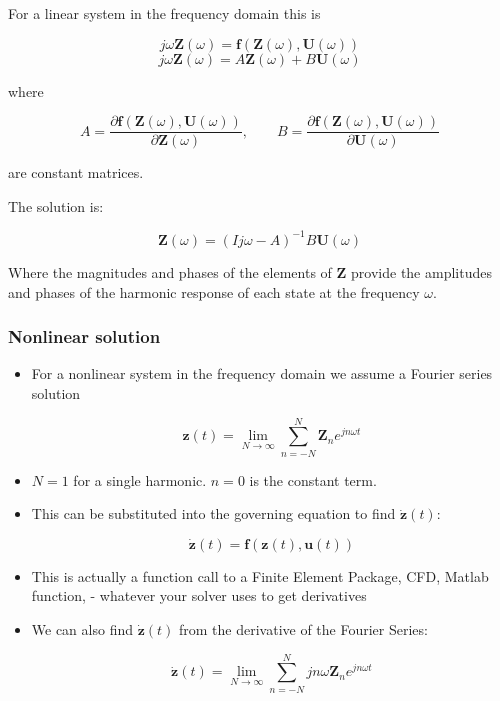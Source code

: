 \documentclass[11pt]{article}
\begin{document}
    For a linear system in the frequency domain this is

\begin{equation}
j\omega\mathbf{Z}(\omega)=\mathbf{f}(\mathbf{Z}(\omega),\mathbf{U}(\omega))
\end{equation}\begin{equation}
j\omega\mathbf{Z}(\omega)=A\mathbf{Z}(\omega)+B\mathbf{U}(\omega)
\end{equation}

where

\begin{equation}
A = \frac{\partial \mathbf{f}(\mathbf{Z}(\omega),\mathbf{U}(\omega))}{\partial\mathbf{Z}(\omega)},\qquad
B = \frac{\partial \mathbf{f}(\mathbf{Z}(\omega),\mathbf{U}(\omega))}{\partial\mathbf{U}(\omega)}
\end{equation}

are constant matrices.

The solution is:

\begin{equation}
\mathbf{Z}(\omega) = \left(Ij\omega-A\right)^{-1}B\mathbf{U}(\omega)
\end{equation}

Where the magnitudes and phases of the elements of \(\mathbf{Z}\)
provide the amplitudes and phases of the harmonic response of each state
at the frequency \(\omega\).

    \subsubsection{Nonlinear solution}\label{nonlinear-solution}

\begin{itemize}
\item
  For a nonlinear system in the frequency domain we assume a Fourier
  series solution

  \begin{equation}
  \mathbf{z}(t)=\lim_{N\to\infty}\sum_{n=-N}^{N}\mathbf{Z}_n e^{j n \omega t}
  \end{equation}
\item
  \(N=1\) for a single harmonic. \(n=0\) is the constant term.
\item
  This can be substituted into the governing equation to find
  \(\dot{\mathbf{z}}(t)\):

  \begin{equation}
  \dot{\mathbf{z}}(t)=\mathbf{f}(\mathbf{z}(t),\mathbf{u}(t))
  \end{equation}
\item
  This is actually a function call to a Finite Element Package, CFD,
  Matlab function, - whatever your solver uses to get derivatives
\item
  We can also find \(\dot{\mathbf{z}}(t)\) from the derivative of the
  Fourier Series:

  \begin{equation}
  \dot{\mathbf{z}}(t)=\lim_{N\to\infty}\sum_{n=-N}^{N}j n \omega\mathbf{Z}_n e^{j n \omega t}
  \end{equation}
\end{itemize}
\end{document}
